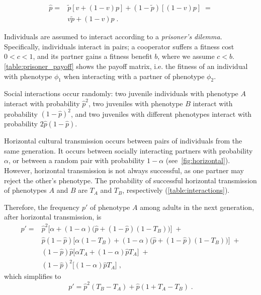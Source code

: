 \documentclass[12pt]{extarticle}
\begin{document}
\begin{equation}\label{eq:horizontal}
\begin{aligned}
\hat{p} =
& \tilde{p} [v + (1-v)p] + (1-\tilde{p}) [(1-v)p] \;= \\
& v \tilde{p} + (1-v) p \;.
\end{aligned}
\end{equation}

Individuals are assumed to interact according to a \emph{prisoner's dilemma}.
Specifically, individuals interact in pairs; a cooperator suffers a fitness cost $0<c<1$, and its partner gains a fitness benefit $b$, where we assume $c<b$. \autoref{table:prisoner_payoff} shows the payoff matrix, i.e. the fitness of an individual with phenotype $\phi_1$ when interacting with a partner of phenotype $\phi_2$.

Social interactions occur randomly:
two juvenile individuals with phenotype $A$ interact with probability $\hat{p}^2$, two juveniles with phenotype $B$ interact with probability $(1-\hat{p})^2$, and two juveniles with different phenotypes interact with probability $2\hat{p}(1-\hat{p})$. 

Horizontal cultural transmission occurs between pairs of individuals from the same generation. 
It occurs between socially interacting partners with probability $\alpha$, or between a random pair with probability $1-\alpha$ (see~\autoref{fig:horizontal}).
However, horizontal transmission is not always successful, as one partner may reject the other's phenotype.
The probability of successful horizontal transmission of phenotypes $A$ and $B$ are $T_A$ and $T_B$, respectively (\autoref{table:interactions}).

Therefore, the frequency $p'$ of phenotype $A$ among adults in the next generation, after horizontal transmission, is 
\begin{equation}\label{eq:nextgen_adults}
\begin{aligned}
p' = 
& \hat{p}^2 \big[\alpha + (1-\alpha)\big(\hat{p} + (1-\hat{p})(1-T_B)\big)\big] \;+ \\
& \hat{p}(1-\hat{p}) \big[\alpha(1-T_B) + (1-\alpha)\big(\hat{p} + (1-\hat{p})(1-T_B)\big)\big] \;+ \\
& (1-\hat{p})\hat{p} \big[\alpha T_A + (1-\alpha) \hat{p} T_A \big] \;+ \\
& (1-\hat{p})^2 \big[(1-\alpha) \hat{p} T_A \big] \;,
\end{aligned}
\end{equation}
which simplifies to
\begin{equation}\label{eq:nextgen_adults_slimpify}
p' = \hat{p}^2(T_B-T_A) + \hat{p}(1+T_A-T_B) \;.
\end{equation}
\end{document}
